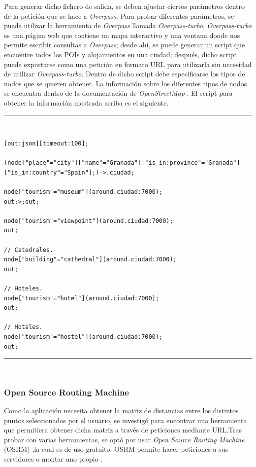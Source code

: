 Para generar dicho fichero de salida, se deben ajustar ciertos parámetros dentro de la petición que se hace a \textit{Overpass}. Para probar diferentes parámetros, se puede utilizar la herramienta de \textit{Overpass} llamada \textit{Overpass-turbo}.\newline
\textit{Overpass-turbo} es una página web que contiene un mapa interactivo y una ventana donde nos permite escribir consultas a \textit{Overpass}; desde ahí, se puede generar un script que encuentre todos los POIs y alojamientos en una ciudad; después, dicho script puede exportarse como una petición en formato URL para utilizarla sin necesidad de utilizar \textit{Overpass-turbo}. Dentro de dicho script debe especificarse los tipos de nodos que se quieren obtener. La información sobre los diferentes tipos de nodos se encuentra dentro de la documentación de \textit{OpenStreetMap} \cite{openstreetmap_doc}. El script para obtener la información mostrada arriba es el siguiente. \newline
\noindent\rule[-1ex]{\textwidth}{1pt}\\
\begin{lstlisting}[caption=Script para encontrar todos los POIs y alojamientos de una ciudad.]
[out:json][timeout:100]; 

(node["place"="city"]["name"="Granada"]["is_in:province"="Granada"]
["is_in:country"="Spain"];)->.ciudad; 

node["tourism"="museum"](around.ciudad:7000);
out;>;out;

node["tourism"="viewpoint"](around.ciudad:7000);
out;

// Catedrales.
node["building"="cathedral"](around.ciudad:7000);
out;

// Hoteles.
node["tourism"="hotel"](around.ciudad:7000);
out;

// Hotales.
node["tourism"="hostel"](around.ciudad:7000);
out;
\end{lstlisting}
\noindent\rule[-1ex]{\textwidth}{1pt}\\
\subsubsection[OSRM]{Open Source Routing Machine}
Como la aplicación necesita obtener la matriz de distancias entre los distintos puntos seleccionados por el usuario, se investigó para encontrar una herramienta que permitiera obtener dicha matriz a través de peticiones mediante URL.Tras probar con varias herramientas, se optó por usar \textit{Open Source Routing Machine} (OSRM) \cite{osmr},la cual es de uso gratuito. OSRM permite hacer peticiones a sus servidores o montar uno propio \cite{osmr_backend}.\newline

